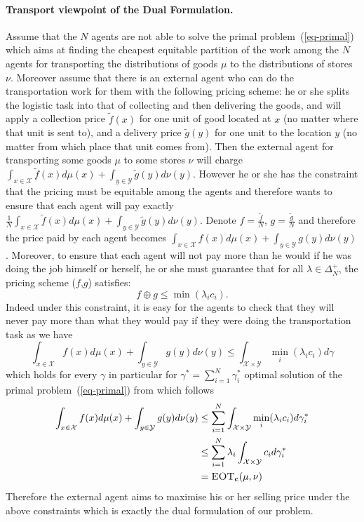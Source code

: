 \paragraph{Transport viewpoint of the Dual Formulation.} Assume that the $N$ agents are not able to solve the primal problem~(\ref{eq-primal}) which aims at finding the cheapest equitable partition of the work among the $N$ agents for transporting the distributions of goods $\mu$ to the distributions of stores $\nu$. Moreover assume that there is an external agent who can do the transportation work for them with the following pricing scheme: he or she splits the logistic task into that of collecting and then delivering the goods, and will apply a collection price $\tilde{f}(x)$ for one unit of good located at $x$ (no matter where that unit is sent to), and a delivery price $\tilde{g}(y)$ for one unit to the location $y$ (no matter from which place that unit comes from). Then the external agent for transporting some goods $\mu$ to some stores $\nu$ will charge $\int_{x\in\mathcal{X}} \tilde{f}(x)d\mu(x)+ \int_{y\in\mathcal{Y}} \tilde{g}(y)d\nu(y)$. However he or she has the constraint that the pricing must be equitable among the agents and therefore wants to ensure that each agent will pay exactly $\frac{1}{N}\int_{x\in\mathcal{X}} \tilde{f}(x)d\mu(x)+ \int_{y\in\mathcal{Y}} \tilde{g}(y)d\nu(y)$. Denote $f=\frac{\tilde{f}}{N}$, $g=\frac{\tilde{g}}{N}$ and therefore the price paid by each agent becomes  $\int_{x\in\mathcal{X}} f(x)d\mu(x)+ \int_{y\in\mathcal{Y}} g(y)d\nu(y)$. Moreover, to ensure that each agent will not pay more than he would if he was doing the job himself or herself, he or she must guarantee that for all $\lambda\in\Delta_N^{+}$, the pricing scheme ($f$,$g$) satisfies: 
$$f\oplus g\leq \min(\lambda_i c_i).$$
Indeed under this constraint, it is easy for the agents to check that they will never pay more than what they would pay if they were doing the transportation task as we have
$$\int_{x\in\mathcal{X}} f(x)d\mu(x)+ \int_{y\in\mathcal{Y}} g(y)d\nu(y)\leq \int_{\mathcal{X}\times\mathcal{Y}} \min_i(\lambda_i c_i) d\gamma $$ 
which holds for every $\gamma$ in particular for $\gamma^{*}=\sum_{i=1}^N\gamma_i^{*}$ optimal solution of the primal problem~(\ref{eq-primal}) from which follows
\begin{align*}
    \int_{x\in\mathcal{X}} f(x)d\mu(x)+ \int_{y\in\mathcal{Y}} g(y)d\nu(y)&\leq\sum_{i=1}^N \int_{\mathcal{X}\times\mathcal{Y}} \min_i(\lambda_i c_i) d\gamma_i^{*}\\
    &\leq \sum_{i=1}^N \lambda_i \int_{\mathcal{X}\times\mathcal{Y}} c_i d\gamma_i^{*}\\
    &=\textsc{EOT}_{\mathbf{c}}(\mu,\nu)
\end{align*}
Therefore the external agent aims to maximise his or her selling price under the above constraints which is exactly the dual formulation of our problem.


